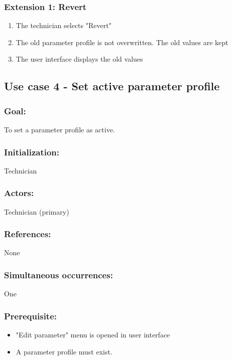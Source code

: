 \subsubsection*{Extension 1: Revert}
\begin{enumerate}
	\item The technician selects "Revert"
	\item The old parameter profile is not overwritten. The old values are kept
	\item The user interface displays the old values
\end{enumerate}


\subsection{Use case 4 - Set active parameter profile}
\subsubsection*{Goal:}
To set a parameter profile as active.

\subsubsection*{Initialization:}
Technician

\subsubsection*{Actors:}
Technician (primary)

\subsubsection*{References:}
None

\subsubsection*{Simultaneous occurrences:}
One

\subsubsection*{Prerequisite:}
\begin{itemize}
	\item "Edit parameter" menu is opened in user interface
	\item A parameter profile must exist.
\end{itemize}

